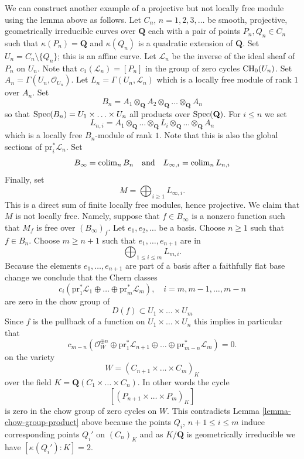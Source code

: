 \noindent
We can construct another example of a projective but not locally free
module using the lemma above as follows. Let
$C_n$, $n = 1, 2, 3, \ldots$ be smooth, projective, geometrically irreducible
curves over $\mathbf{Q}$ each with a pair of points
$P_n, Q_n \in C_n$ such that $\kappa(P_n) = \mathbf{Q}$ and
$\kappa(Q_n)$ is a quadratic extension of $\mathbf{Q}$.
Set $U_n = C_n \setminus \{Q_n\}$; this is an affine curve.
Let $\mathcal{L}_n$ be the inverse of the ideal sheaf of $P_n$
on $U_n$. Note that $c_1(\mathcal{L}_n) = [P_n]$ in the group of
zero cycles $\mathop{\mathrm{CH}}\nolimits_0(U_n)$. Set $A_n = \Gamma(U_n, \mathcal{O}_{U_n})$.
Let $L_n = \Gamma(U_n, \mathcal{L}_n)$ which is a locally
free module of rank $1$ over $A_n$. Set
$$
B_n = A_1 \otimes_{\mathbf{Q}} A_2 \otimes_{\mathbf{Q}} \ldots
\otimes_{\mathbf{Q}} A_n
$$
so that $\mathop{\mathrm{Spec}}(B_n) = U_1 \times \ldots \times U_n$ all products
over $\mathop{\mathrm{Spec}}(\mathbf{Q})$. For $i \leq n$ we set
$$
L_{n, i} =
A_1 \otimes_{\mathbf{Q}} \ldots \otimes_{\mathbf{Q}} L_i
\otimes_{\mathbf{Q}} \ldots \otimes_{\mathbf{Q}} A_n
$$
which is a locally free $B_n$-module of rank $1$. Note that this is
also the global sections of $\text{pr}_i^*\mathcal{L}_n$. Set
$$
B_\infty = \mathop{\mathrm{colim}}\nolimits_n B_n
\quad\text{and}\quad
L_{\infty, i} = \mathop{\mathrm{colim}}\nolimits_n L_{n, i}
$$
Finally, set
$$
M = \bigoplus\nolimits_{i \geq 1} L_{\infty, i}.
$$
This is a direct sum of finite locally free modules, hence projective.
We claim that $M$ is not locally free. Namely, suppose that
$f \in B_\infty$ is a nonzero function such that $M_f$ is free
over $(B_\infty)_f$. Let $e_1, e_2, \ldots$ be a basis. Choose
$n \geq 1$ such that $f \in B_n$.
Choose $m \geq n + 1$ such that $e_1, \ldots, e_{n + 1}$ are in
$$
\bigoplus\nolimits_{1 \leq i \leq m} L_{m, i}.
$$
Because the elements $e_1, \ldots, e_{n + 1}$ are part of a basis
after a faithfully flat base change we conclude that
the Chern classes
$$
c_i(\text{pr}_1^*\mathcal{L}_1 \oplus \ldots \oplus
\text{pr}_m^*\mathcal{L}_m), \quad i = m, m - 1, \ldots, m - n
$$
are zero in the chow group of
$$
D(f) \subset U_1 \times \ldots \times U_m
$$
Since $f$ is the pullback of a function on $U_1 \times \ldots \times U_n$
this implies in particular that
$$
c_{m - n}(\mathcal{O}_W^{\oplus n} \oplus
\text{pr}_1^*\mathcal{L}_{n + 1} \oplus \ldots
\oplus \text{pr}_{m - n}^*\mathcal{L}_m) = 0.
$$
on the variety
$$
W = (C_{n + 1} \times \ldots \times C_m)_K
$$
over the field $K = \mathbf{Q}(C_1 \times \ldots \times C_n)$.
In other words the cycle
$$
[(P_{n + 1} \times \ldots \times P_m)_K]
$$
is zero in the chow group of zero cycles on $W$. This contradicts
Lemma \ref{lemma-chow-group-product}
above because the points $Q_i$, $n + 1 \leq i \leq m$
induce corresponding points $Q_i'$ on $(C_n)_K$ and as $K/\mathbf{Q}$
is geometrically irreducible we have $[\kappa(Q_i') : K] = 2$.

